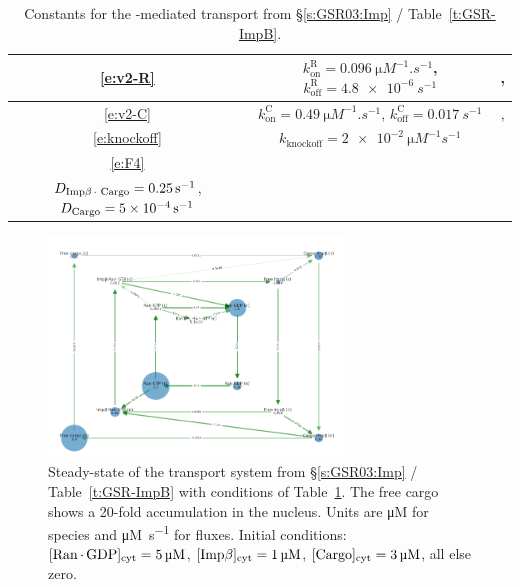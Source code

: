 \documentclass[12pt,notitlepage]{article}
\begin{document}
\begin{table}
\centering
\small
\begin{tabular}{c|c|c}
	\hline
	\eqref{e:v2-R}
	&
	$k_\text{on}^\text{R} = \SI{0.096}{\micro M^{-1} . s^{-1}}$,
	\;
	$k_\text{off}^\text{R} = \SI{4.8e-6}{s^{-1}}$
	&
	\cite[Supp.~Table~A]{GoerlichSeewaldRibbeck2003},
	\cite[Table II]{RiddickMacara2005}
	\\
	\hline
	\eqref{e:v2-C}
	&
	$k_\text{on}^\text{C} = \SI{0.49}{\micro M^{-1} . s^{-1}}$,
	\quad
	$k_\text{off}^\text{C} = \SI{0.017}{s^{-1}}$
	&
	\cite[below Fig.~3]{Catimel2001},
	\cite[Table II]{RiddickMacara2005}
	\\
	\hline
	\eqref{e:knockoff}
	&
	$k_\text{knockoff} = \SI{2e-2}{\micro M^{-1} s^{-1}}$
	&
	\cite[Table II]{RiddickMacara2005}
	\\
	\hline
	\eqref{e:F4}
	&
	\makecell{
		$D_{\ce{Imp\beta . Ran . GTP}} = \SI{0.07}{s^{-1}}$, \quad
		$D_{\ce{Imp\beta}} = \SI{0.4}{s^{-1}}$
		\\
		$D_{\ce{Imp\beta . Cargo}} = \SI{0.25}{s^{-1}}$, \;	
		$D_{\ce{Cargo}} = \SI{5e-4}{s^{-1}}$
	}
	&
	\cite[Table III]{RiddickMacara2005}
	\\
	\hline
\end{tabular}
%
\caption{%
	Constants for the -mediated
	transport from \S\ref{s:GSR03:Imp} / Table~\ref{t:GSR-ImpB}.
}
%
\label{t:GSR-ImpB-const}
\end{table}



\begin{figure}
\centering
\includegraphics[width=0.7\textwidth]{20210225-GSR/v2/python/b_graph1/onion}
\caption{%
	Steady-state of 
	the transport system from 
	\S\ref{s:GSR03:Imp} / Table~\ref{t:GSR-ImpB}
	with conditions 
	of Table~\ref{t:GSR-ImpB-const}.
	The free cargo
	shows a 20-fold accumulation
	in the nucleus.
	Units are \si{\micro M} for species
	and \si{\micro M . s^{-1}} for fluxes.
	Initial conditions:
	$[\ce{Ran . GDP}]_\text{cyt} = \SI{5}{\micro M}$,
	$[\ce{Imp$\beta$}]_\text{cyt} = \SI{1}{\micro M}$,
	$[\ce{Cargo}]_\text{cyt} = \SI{3}{\micro M}$,
	all else zero.
}
\label{f:GSR-v2}
\end{figure}
\end{document}
